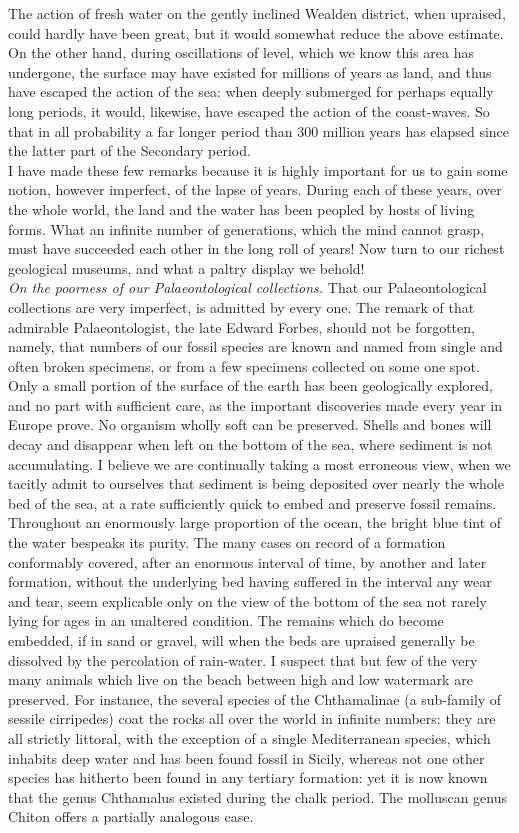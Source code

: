 \indent The action of fresh water on the gently inclined Wealden district, when upraised, could hardly have been great, but it would somewhat reduce the above estimate. On the other hand, during oscillations of level, which we know this area has undergone, the surface may have existed for millions of years as land, and thus have escaped the action of the sea: when deeply submerged for perhaps equally long periods, it would, likewise, have escaped the action of the coast-waves.  So that in all probability a far longer period than 300 million years has elapsed since the latter part of the Secondary period.\\
\indent I have made these few remarks because it is highly important for us to gain some notion, however imperfect, of the lapse of years. During each of these years, over the whole world, the land and the water has been peopled by hosts of living forms. What an infinite number of generations, which the mind cannot grasp, must have succeeded each other in the long roll of years! Now turn to our richest geological museums, and what a paltry display we behold!\\
\indent \emph{On the poorness of our Palaeontological collections.} That our Palaeontological collections are very imperfect, is admitted by every one. The remark of that admirable Palaeontologist, the late Edward Forbes, should not be forgotten, namely, that numbers of our fossil species are known and named from single and often broken specimens, or from a few specimens collected on some one spot. Only a small portion of the surface of the earth has been geologically explored, and no part with sufficient care, as the important discoveries made every year in Europe prove. No organism wholly soft can be preserved. Shells and bones will decay and disappear when left on the bottom of the sea, where sediment is not accumulating. I believe we are continually taking a most erroneous view, when we tacitly admit to ourselves that sediment is being deposited over nearly the whole bed of the sea, at a rate sufficiently quick to embed and preserve fossil remains. Throughout an enormously large proportion of the ocean, the bright blue tint of the water bespeaks its purity.  The many cases on record of a formation conformably covered, after an enormous interval of time, by another and later formation, without the underlying bed having suffered in the interval any wear and tear, seem explicable only on the view of the bottom of the sea not rarely lying for ages in an unaltered condition. The remains which do become embedded, if in sand or gravel, will when the beds are upraised generally be dissolved by the percolation of rain-water.  I suspect that but few of the very many animals which live on the beach between high and low watermark are preserved. For instance, the several species of the Chthamalinae (a sub-family of sessile cirripedes) coat the rocks all over the world in infinite numbers: they are all strictly littoral, with the exception of a single Mediterranean species, which inhabits deep water and has been found fossil in Sicily, whereas not one other species has hitherto been found in any tertiary formation: yet it is now known that the genus Chthamalus existed during the chalk period. The molluscan genus Chiton offers a partially analogous case.\\
